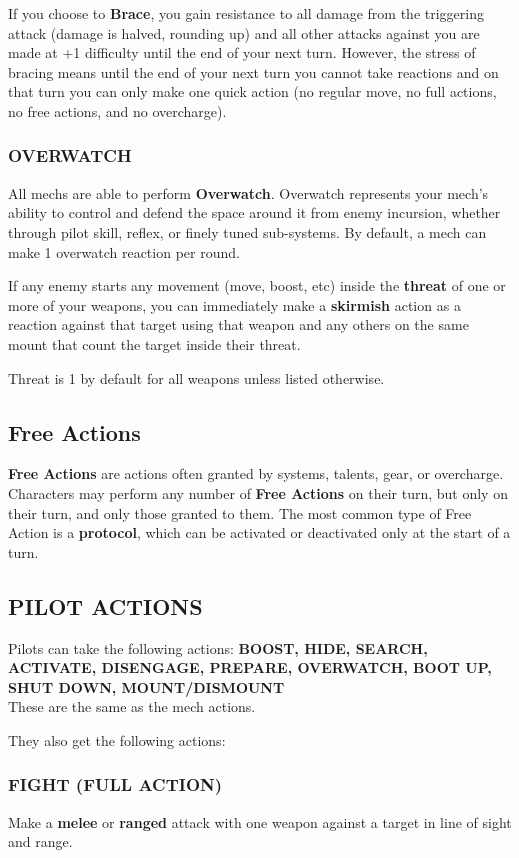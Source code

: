 If you choose to \textbf{Brace}, you gain resistance to all damage from the triggering attack (damage is halved, rounding up) and all other attacks against you are made at +1 difficulty until the end of your next turn. However, the stress of bracing means until the end of your next turn you cannot take reactions and on that turn you can only make one quick action (no regular move, no full actions, no free actions, and no overcharge).

\subsubsection{OVERWATCH}
All mechs are able to perform \textbf{Overwatch}. Overwatch represents your mech’s ability to control and defend the space around it from enemy incursion, whether through pilot skill, reflex, or finely tuned sub-systems. By default, a mech can make 1 overwatch reaction per round.

If any enemy starts any movement (move, boost, etc) inside the \textbf{threat} of one or more of your weapons, you can immediately make a \textbf{skirmish} action as a reaction against that target using that weapon and any others on the same mount that count the target inside their threat.

Threat is 1 by default for all weapons unless listed otherwise.

\subsection{Free Actions}
\textbf{Free Actions} are actions often granted by systems, talents, gear, or overcharge. Characters may perform any number of \textbf{Free Actions} on their turn, but only on their turn, and only those granted to them. The most common type of Free Action is a \textbf{protocol}, which can be activated or deactivated only at the start of a turn.

\subsection{PILOT ACTIONS}
Pilots can take the following actions: \textbf{BOOST, HIDE, SEARCH, ACTIVATE, DISENGAGE,  PREPARE, OVERWATCH, BOOT UP, SHUT DOWN, MOUNT/DISMOUNT}\\
These are the same as the mech actions.

They also get the following actions:

\subsubsection{FIGHT (FULL ACTION)}
Make a \textbf{melee} or \textbf{ranged} attack with one weapon against a target in line of sight and range.

